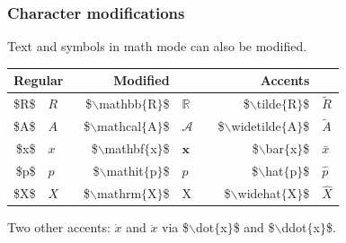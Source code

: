 \begin{frame} \frametitle{Character modifications}
Text and symbols in math mode can also be modified.
\begin{center}
\begin{tabular}{rl p{4mm} rl p{4mm} rl}
\hline
\multicolumn{3}{l}{Regular} & {Modified} &&& {Accents} & \\
\hline
{\color{braces}\${\color{black}R}\$} & $R$ &&
{\color{braces}\${\color{command}$\backslash$mathbb}$\{${\color{black}R}$\}$\$} & $\mathbb{R}$ &&
{\color{braces}\${\color{command}$\backslash$tilde}$\{${\color{black}R}$\}$\$} & $\tilde{R}$ \\
{\color{braces}\${\color{black}A}\$} & $A$ &&
{\color{braces}\${\color{command}$\backslash$mathcal}$\{${\color{black}A}$\}$\$} & $\mathcal{A}$ &&
{\color{braces}\${\color{command}$\backslash$widetilde}$\{${\color{black}A}$\}$\$} & $\widetilde{A}$ \\
{\color{braces}\${\color{black}x}\$} & $x$ &&
{\color{braces}\${\color{command}$\backslash$mathbf}$\{${\color{black}x}$\}$\$} & $\mathbf{x}$ &&
{\color{braces}\${\color{command}$\backslash$bar}$\{${\color{black}x}$\}$\$} & $\bar{x}$ \\
{\color{braces}\${\color{black}p}\$} & $p$ &&
{\color{braces}\${\color{command}$\backslash$mathit}$\{${\color{black}p}$\}$\$} & $\mathit{p}$ &&
{\color{braces}\${\color{command}$\backslash$hat}$\{${\color{black}p}$\}$\$} & $\hat{p}$ \\
{\color{braces}\${\color{black}X}\$} & $X$ &&
{\color{braces}\${\color{command}$\backslash$mathrm}$\{${\color{black}X}$\}$\$} & $\mathrm{X}$ &&
{\color{braces}\${\color{command}$\backslash$widehat}$\{${\color{black}X}$\}$\$} & $\widehat{X}$ \\
\hline
\end{tabular}
\end{center}
Two other accents: $\dot{x}$ and $\ddot{x}$ via {\color{braces}\${\color{command}$\backslash$dot}$\{${\color{black}x}$\}$\$} and {\color{braces}\${\color{command}$\backslash$ddot}$\{${\color{black}x}$\}$\$}.
\end{frame}

